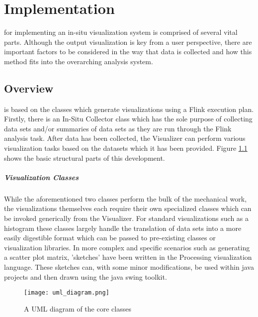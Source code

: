 \chapter{Implementation}
\label{sec:implementation}
 for implementing an in-situ visualization system is comprised of several vital parts. Although the  output visualization is key from a user perspective, there are important factors to be considered in the way that data is collected and how this method fits into the overarching analysis system. 
 
\section{Overview}
\label{sec:overview}
 is based on the classes which generate visualizations using a Flink execution plan. Firstly, there is an In-Situ Collector class which has the sole purpose of collecting data sets and/or summaries of data sets as they are run through the Flink analysis task. After data has been collected, the Visualizer can perform various visualization tasks based on the datasets which it has been provided. Figure \ref{fig:uml} shows the basic structural parts of this development. 

\paragraph{Visualization Classes}
While the aforementioned two classes perform the  bulk of the mechanical work, the visualizations themselves each require their own specialized classes which can be invoked generically from the Visualizer. For standard visualizations such as a histogram these classes largely handle the translation of data sets into a more easily digestible format which can be passed to pre-existing classes or visualization libraries. In more complex and specific scenarios such as generating a scatter plot matrix, 'sketches' have been written in the Processing visualization language. These sketches can, with some minor modifications, be used within java projects and then drawn using the java swing toolkit. 

\begin{figure}
	\centering
	\label{fig:uml}
	\texttt{[image: uml\_diagram.png]}
	\caption{A UML diagram of the core classes}
\end{figure}

